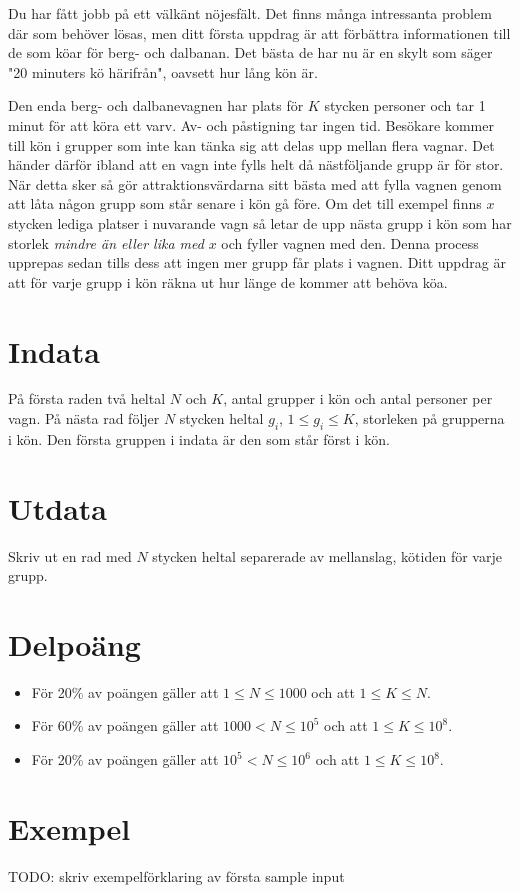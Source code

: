 Du har fått jobb på ett välkänt nöjesfält. Det finns många intressanta problem där som behöver lösas, men ditt första uppdrag är att förbättra informationen till de som köar för berg- och dalbanan. Det bästa de har nu är en skylt som säger "20 minuters kö härifrån", oavsett hur lång kön är.

Den enda berg- och dalbanevagnen har plats för $K$ stycken personer och tar 1 minut för att köra ett varv. Av- och påstigning tar ingen tid. Besökare kommer till kön i grupper som inte kan tänka sig att delas upp mellan flera vagnar. Det händer därför ibland att en vagn inte fylls helt då nästföljande grupp är för stor. När detta sker så gör attraktionsvärdarna sitt bästa med att fylla vagnen genom att låta någon grupp som står senare i kön gå före. Om det till exempel finns $x$ stycken lediga platser i nuvarande vagn så letar de upp nästa grupp i kön som har storlek \emph{mindre än eller lika med} $x$ och fyller vagnen med den. Denna process upprepas sedan tills dess att ingen mer grupp får plats i vagnen. Ditt uppdrag är att för varje grupp i kön räkna ut hur länge de kommer att behöva köa.

\section*{Indata}
På första raden två heltal $N$ och $K$, antal grupper i kön och antal personer per vagn. På nästa rad följer $N$ stycken heltal $g_i$, $1 \leq g_i \leq K$, storleken på grupperna i kön. Den första gruppen i indata är den som står först i kön.

\section*{Utdata}
Skriv ut en rad med $N$ stycken heltal separerade av mellanslag, kötiden för varje grupp.

\section*{Delpoäng}
\begin{itemize}
\item För 20\% av poängen gäller att $1 \leq N \leq 1000$ och att $1 \leq K \leq N$.
\item För 60\% av poängen gäller att $1000 < N \leq 10^{5}$ och att $1 \leq K \leq 10^8$.
\item För 20\% av poängen gäller att $10^5 < N \leq 10^6$ och att $1 \leq K \leq 10^8$.
\end{itemize}

\section*{Exempel}
TODO: skriv exempelförklaring av första sample input

